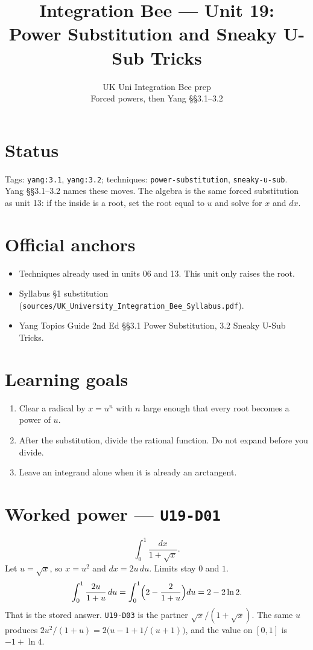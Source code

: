 
\title{Integration Bee --- Unit 19:\\ Power Substitution and Sneaky U-Sub Tricks}
\author{UK Uni Integration Bee prep\\ Forced powers, then Yang \S\S3.1--3.2}
\date{}

\maketitle
\section*{Status}
Tags: \texttt{yang:3.1}, \texttt{yang:3.2}; techniques: \texttt{power-substitution}, \texttt{sneaky-u-sub}.
Yang \S\S3.1--3.2 names these moves. The algebra is the same forced substitution as unit 13: if the inside is a root, set the root equal to $u$ and solve for $x$ and $dx$.
\section{Official anchors}
\begin{itemize}
\item Techniques already used in units 06 and 13. This unit only raises the root.
\item Syllabus \S1 substitution (\texttt{sources/UK\_University\_Integration\_Bee\_Syllabus.pdf}).
\item Yang Topics Guide 2nd Ed \S\S3.1 Power Substitution, 3.2 Sneaky U-Sub Tricks.
\end{itemize}
\section{Learning goals}
\begin{enumerate}
  \item Clear a radical by $x=u^n$ with $n$ large enough that every root becomes a power of $u$.
  \item After the substitution, divide the rational function. Do not expand before you divide.
  \item Leave an integrand alone when it is already an arctangent.
\end{enumerate}

\section{Worked power --- \texttt{U19-D01}}
\[
\int_0^1\frac{dx}{1+\sqrt{x}}.
\]
Let $u=\sqrt{x}$, so $x=u^2$ and $dx=2u\,du$. Limits stay $0$ and $1$.
\[
\int_0^1\frac{2u}{1+u}\,du=\int_0^1\Bigl(2-\frac{2}{1+u}\Bigr)du=2-2\ln 2.
\]
That is the stored answer. \texttt{U19-D03} is the partner $\sqrt{x}/(1+\sqrt{x})$. The same $u$ produces $2u^2/(1+u)=2\bigl(u-1+1/(u+1)\bigr)$, and the value on $[0,1]$ is $-1+\ln 4$.

